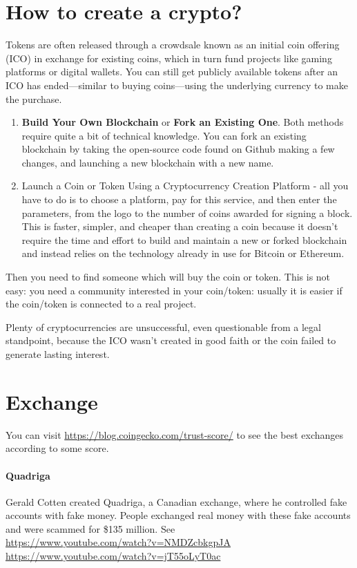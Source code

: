 \section{How to create a crypto?}

Tokens are often released through a crowdsale known as an initial coin offering (ICO) in exchange for existing coins, which in turn fund projects like gaming platforms or digital wallets. You can still get publicly available tokens after an ICO has ended—similar to buying coins—using the underlying currency to make the purchase.

\begin{enumerate}
	\item \textbf{Build Your Own Blockchain} or \textbf{Fork an Existing One}. Both methods require quite a bit of technical knowledge. You can fork an existing blockchain by taking the open-source code found on Github making a few changes, and launching a new blockchain with a new name.
	\item Launch a Coin or Token Using a Cryptocurrency Creation Platform - all you have to do is to choose a platform, pay for this service, and then enter the parameters, from the logo to the number of coins awarded for signing a block.
	This is faster, simpler, and cheaper than creating a coin because it doesn't require the time and effort to build and maintain a new or forked blockchain and instead relies on the technology already in use for Bitcoin or Ethereum.
\end{enumerate}

Then you need to find someone which will buy the coin or token. This is not easy: you need a community interested in your coin/token: usually it is easier if the coin/token is connected to a real project.

Plenty of cryptocurrencies are unsuccessful, even questionable from a legal standpoint, because the ICO wasn't created in good faith or the coin failed to generate lasting interest.

\section{Exchange}

You can visit \url{https://blog.coingecko.com/trust-score/} to see the best exchanges according to some score.

\paragraph{Quadriga} Gerald Cotten created Quadriga, a Canadian exchange, where he controlled fake accounts with fake money. People exchanged real money with these fake accounts and were scammed for \$135 million. See\\
\url{https://www.youtube.com/watch?v=NMDZcbkgpJA}\\
\url{https://www.youtube.com/watch?v=jT55oLyT0ac}

